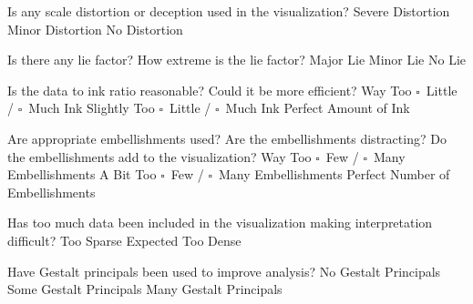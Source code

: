 \documentclass[a4paper,12pt]{article}
\begin{document}
        
\EndTable  



	{Is any scale distortion or deception used in the visualization?}	
	{\choice Severe Distortion}
	{\choice Minor Distortion}
	{\choice No Distortion} 
        
	{Is there any lie factor? How extreme is the lie factor?}
	{\choice Major Lie}
	{\choice Minor Lie}
	{\choice No Lie} 

	{Is the data to ink ratio reasonable? Could it be more efficient?}
	{Way Too $\square$~Little / $\square$~Much Ink}
	{Slightly Too $\square$~Little / $\square$~Much Ink}
	{\choice Perfect Amount of Ink} 
        
	{Are appropriate embellishments used? Are the embellishments 
    	distracting? Do the embellishments add to the visualization?}
	{Way Too $\square$~Few / $\square$~Many Embellishments}
	{A Bit Too $\square$~Few / $\square$~Many Embellishments}
	{\choice Perfect Number of Embellishments} 
        
	{Has too much data been included in the visualization making 
    	interpretation difficult? } 
	{\choice Too Sparse}
	{\choice Expected}
	{\choice Too Dense} 
        
        
	{Have Gestalt principals been used to improve analysis?}
	{\choice No Gestalt Principals}
	{\choice Some Gestalt Principals}
	{\choice Many Gestalt Principals} 
        
\EndTable  
        
\end{document}
